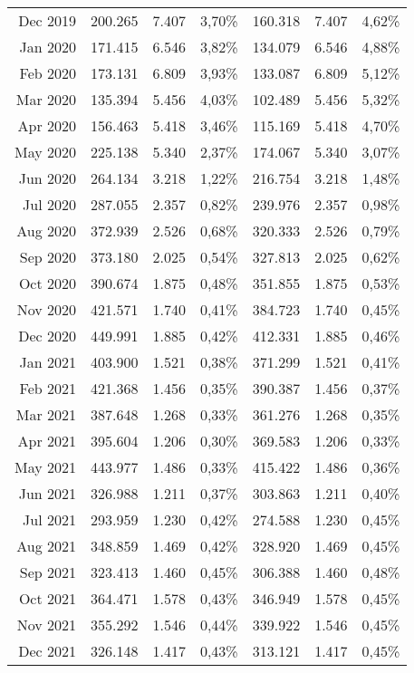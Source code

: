 \begin{longtable}{r|rrr|rrr}
Dec 2019 & 200.265 & 7.407 & 3,70\% & 160.318 & 7.407 & 4,62\% \\
Jan 2020 & 171.415 & 6.546 & 3,82\% & 134.079 & 6.546 & 4,88\% \\
Feb 2020 & 173.131 & 6.809 & 3,93\% & 133.087 & 6.809 & 5,12\% \\
Mar 2020 & 135.394 & 5.456 & 4,03\% & 102.489 & 5.456 & 5,32\% \\
Apr 2020 & 156.463 & 5.418 & 3,46\% & 115.169 & 5.418 & 4,70\% \\
May 2020 & 225.138 & 5.340 & 2,37\% & 174.067 & 5.340 & 3,07\% \\
Jun 2020 & 264.134 & 3.218 & 1,22\% & 216.754 & 3.218 & 1,48\% \\
Jul 2020 & 287.055 & 2.357 & 0,82\% & 239.976 & 2.357 & 0,98\% \\
Aug 2020 & 372.939 & 2.526 & 0,68\% & 320.333 & 2.526 & 0,79\% \\
Sep 2020 & 373.180 & 2.025 & 0,54\% & 327.813 & 2.025 & 0,62\% \\
Oct 2020 & 390.674 & 1.875 & 0,48\% & 351.855 & 1.875 & 0,53\% \\
Nov 2020 & 421.571 & 1.740 & 0,41\% & 384.723 & 1.740 & 0,45\% \\
Dec 2020 & 449.991 & 1.885 & 0,42\% & 412.331 & 1.885 & 0,46\% \\
Jan 2021 & 403.900 & 1.521 & 0,38\% & 371.299 & 1.521 & 0,41\% \\
Feb 2021 & 421.368 & 1.456 & 0,35\% & 390.387 & 1.456 & 0,37\% \\
Mar 2021 & 387.648 & 1.268 & 0,33\% & 361.276 & 1.268 & 0,35\% \\
Apr 2021 & 395.604 & 1.206 & 0,30\% & 369.583 & 1.206 & 0,33\% \\
May 2021 & 443.977 & 1.486 & 0,33\% & 415.422 & 1.486 & 0,36\% \\
Jun 2021 & 326.988 & 1.211 & 0,37\% & 303.863 & 1.211 & 0,40\% \\
Jul 2021 & 293.959 & 1.230 & 0,42\% & 274.588 & 1.230 & 0,45\% \\
Aug 2021 & 348.859 & 1.469 & 0,42\% & 328.920 & 1.469 & 0,45\% \\
Sep 2021 & 323.413 & 1.460 & 0,45\% & 306.388 & 1.460 & 0,48\% \\
Oct 2021 & 364.471 & 1.578 & 0,43\% & 346.949 & 1.578 & 0,45\% \\
Nov 2021 & 355.292 & 1.546 & 0,44\% & 339.922 & 1.546 & 0,45\% \\
Dec 2021 & 326.148 & 1.417 & 0,43\% & 313.121 & 1.417 & 0,45\% \\

\end{longtable}
